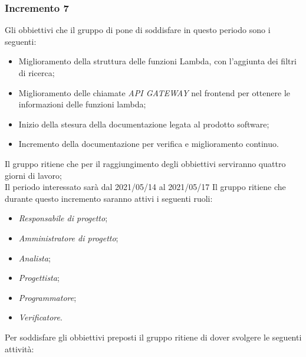 \subsubsection{Incremento 7}
Gli obbiettivi che il gruppo di pone di soddisfare in questo periodo sono i seguenti:
\begin{itemize}
    \item Miglioramento della struttura delle funzioni Lambda, con l'aggiunta dei filtri di ricerca;
    \item Miglioramento delle chiamate \textit{API GATEWAY} nel frontend per ottenere le informazioni delle funzioni lambda;
    \item Inizio della stesura della documentazione legata al prodotto software;
    \item Incremento della documentazione per verifica e miglioramento continuo.
\end{itemize}
Il gruppo ritiene che per il raggiungimento degli obbiettivi serviranno quattro giorni di lavoro;\\
Il periodo interessato sarà dal 2021/05/14 al 2021/05/17
Il gruppo ritiene che durante questo incremento saranno attivi i seguenti ruoli:
\begin{itemize}
    \item \textit{Responsabile di progetto};
    \item \textit{Amministratore di progetto};
    \item \textit{Analista};
    \item \textit{Progettista};
    \item \textit{Programmatore};
    \item \textit{Verificatore}.
\end{itemize}
Per soddisfare gli obbiettivi preposti il gruppo ritiene di dover svolgere le seguenti attività:
